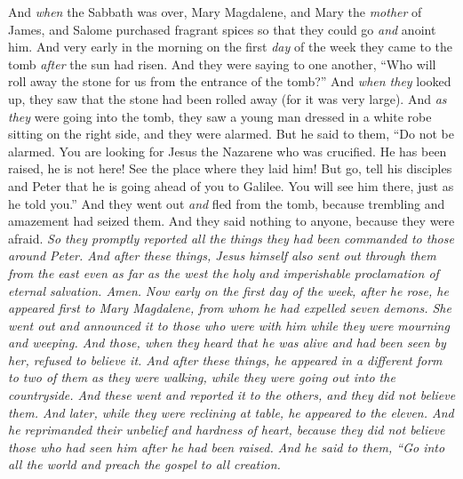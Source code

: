 \begin{biblechapter} %
 And \textit{when} the Sabbath was over, Mary Magdalene, and Mary the \textit{mother} of James, and Salome purchased fragrant spices so that they could go \textit{and} anoint him.
\verse And very early in the morning on the first \textit{day} of the week they came to the tomb \textit{after} the sun had risen.
\verse And they were saying to one another, “Who will roll away the stone for us from the entrance of the tomb?”
\verse And \textit{when they} looked up, they saw that the stone had been rolled away (for it was very large).
\verse And \textit{as they} were going into the tomb, they saw a young man dressed in a white robe sitting on the right side, and they were alarmed.
\verse But he said to them, “Do not be alarmed. You are looking for Jesus the Nazarene who was crucified. He has been raised, he is not here! See the place where they laid him!
\verse But go, tell his disciples and Peter that he is going ahead of you to Galilee. You will see him there, just as he told you.”
\verse And they went out \textit{and} fled from the tomb, because trembling and amazement had seized them. And they said nothing to anyone, because they were afraid. \textit{So they promptly reported all the \textit{things} they had been commanded to those around Peter. And after these \textit{things}, Jesus himself also sent out through them from the east even as far as the west the holy and imperishable proclamation of eternal salvation. Amen.}
 \textit{Now early on the first \textit{day} of the week, \textit{after he} rose, he appeared first to Mary Magdalene, from whom he had expelled seven demons.
\verse She went out \textit{and} announced \textit{it} to those who were with him \textit{while they} were mourning and weeping.
\verse And those, \textit{when they} heard that he was alive and had been seen by her, refused to believe \textit{it}.
\verse And after these \textit{things}, he appeared in a different form to two of them \textit{as they} were walking, \textit{while they} were going out into the countryside.
\verse And these went \textit{and} reported \textit{it} to the others, and they did not believe them.
\verse And later, \textit{while} they were reclining at table, he appeared to the eleven. And he reprimanded their unbelief and hardness of heart, because they did not believe those who had seen him \textit{after he} had been raised.
\verse And he said to them, “Go into all the world \textit{and} preach the gospel to all creation.
}
\end{biblechapter}

